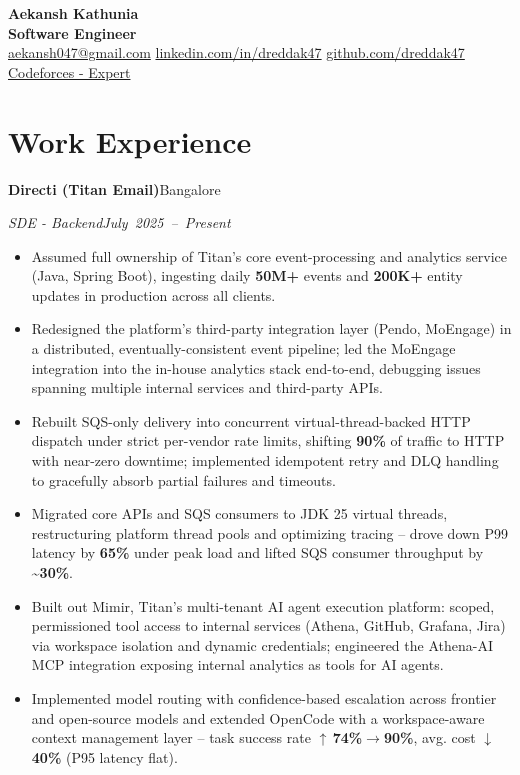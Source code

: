 \documentclass[10pt,letterpaper]{article}
\newcommand{\resumeHeading}[4]{%
  \par\noindent\textbf{#1}\hfill\mbox{#2}\par
  \noindent\textit{#3}\hfill\mbox{\textit{#4}}\par
}
\begin{document}
\begin{center}
  {\LARGE\bfseries Aekansh Kathunia}\\[-1pt]
  \textbf{Software Engineer}\\[1pt]

  \href{mailto:aekansh047@gmail.com}{aekansh047@gmail.com}
  \enspace\textbar\enspace \href{https://www.linkedin.com/in/dreddak47}{linkedin.com/in/dreddak47}
  \enspace\textbar\enspace
  \href{https://github.com/dreddak47}{github.com/dreddak47}
  \enspace\textbar\enspace
  \href{https://codeforces.com/profile/dredd_ak47}{Codeforces - Expert}
\end{center}
\vspace{-10pt}

\section{Work Experience}
\resumeHeading{Directi (Titan Email)}{Bangalore}{SDE - Backend}{July 2025 -- Present}
\begin{itemize}
\item Assumed full ownership of Titan's core event-processing and analytics service (Java, Spring Boot), ingesting daily \textbf{50M+} events and \textbf{200K+} entity updates in production across all clients.
\item Redesigned the platform's third-party integration layer (Pendo, MoEngage) in a distributed, eventually-consistent event pipeline; led the MoEngage integration into the in-house analytics stack end-to-end, debugging issues spanning multiple internal services and third-party APIs.
\item Rebuilt SQS-only delivery into concurrent virtual-thread-backed HTTP dispatch under strict per-vendor rate limits, shifting \textbf{90\%} of traffic to HTTP with near-zero downtime; implemented idempotent retry and DLQ handling to gracefully absorb partial failures and timeouts.
\item Migrated core APIs and SQS consumers to JDK 25 virtual threads, restructuring platform thread pools and optimizing tracing -- drove down P99 latency by \textbf{65\%} under peak load and lifted SQS consumer throughput by \textbf{\textasciitilde 30\%}.
\item Built out Mimir, Titan's multi-tenant AI agent execution platform: scoped, permissioned tool access to internal services (Athena, GitHub, Grafana, Jira) via workspace isolation and dynamic credentials; engineered the Athena-AI MCP integration exposing internal analytics as tools for AI agents.
\item Implemented model routing with confidence-based escalation across frontier and open-source models and extended OpenCode with a workspace-aware context management layer -- task success rate $\uparrow$\,\textbf{74\%$\to$90\%}, avg. cost $\downarrow$\,\textbf{40\%} (P95 latency flat).
\end{itemize}
\end{document}

